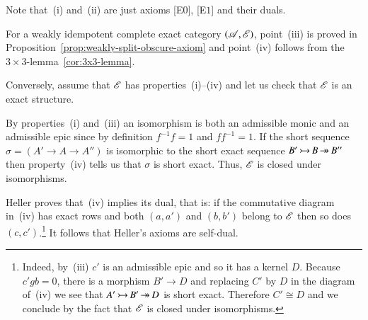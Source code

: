 \documentclass[1p]{elsarticle}
\makeatletter
\renewenvironment{proof}[1][\proofname]{\par
  \pushQED{\qed}%
  \normalfont \topsep6\p@\@plus6\p@\relax
  \trivlist
  \item[\hskip\labelsep
        \scshape
    #1\@addpunct{.}]\ignorespaces
}{%
  \popQED\endtrivlist\@endpefalse
}
\theoremstyle{mythm}
\theoremstyle{mydef}
\makeatother
\begin{document}
\begin{proof}
  Note that~(i) and~(ii) are just axioms [E$0$], [E$1$] and their
  duals.
  
  For a weakly idempotent complete exact category
  $(\operatorname{\mathscr{A}},\operatorname{\mathscr{E}})$, point~(iii) is proved in
  Proposition~\ref{prop:weakly-split-obscure-axiom} and point~(iv) 
  follows from the $3 \times 3$-lemma~\ref{cor:3x3-lemma}.
  
  Conversely, assume that $\operatorname{\mathscr{E}}$ has properties~(i)--(iv) and let us
  check that $\operatorname{\mathscr{E}}$ is an exact structure.
  
  By properties~(i) and~(iii) an isomorphism is both an admissible
  monic and an admissible epic since by definition $f^{-1}f = 1$ and
  $ff^{-1} = 1$. If the short sequence $\sigma = (A' \to A \to A'')$ is
  isomorphic to the short exact sequence $B' \operatorname{\rightarrowtail} B \operatorname{\twoheadrightarrow} B''$ then
  property~(iv) tells us that $\sigma$ is short exact. Thus, $\operatorname{\mathscr{E}}$
  is closed under isomorphisms. 

  Heller proves \cite[Proposition~4.1]{MR0100622} that~(iv) implies
  its dual, that is: if the commutative diagram in~(iv) has exact rows
  and both $(a,a')$ and $(b,b')$ belong to $\operatorname{\mathscr{E}}$ then
  so does $(c,c')$.\footnote{Indeed, by~(iii) $c'$ is an admissible epic and so
    it has a kernel $D$. Because $c'gb = 0$, there is a morphism 
    $B' \to D$ and replacing $C'$ by $D$ in the diagram of~(iv) 
    we see that $A' \operatorname{\rightarrowtail} B' \operatorname{\twoheadrightarrow} D$ is short exact. 
    Therefore $C' \cong D$ and we
    conclude by the fact that $\operatorname{\mathscr{E}}$ is closed under isomorphisms.} It
  follows that Heller's axioms are self-dual.
  

\end{proof}
\end{document}
